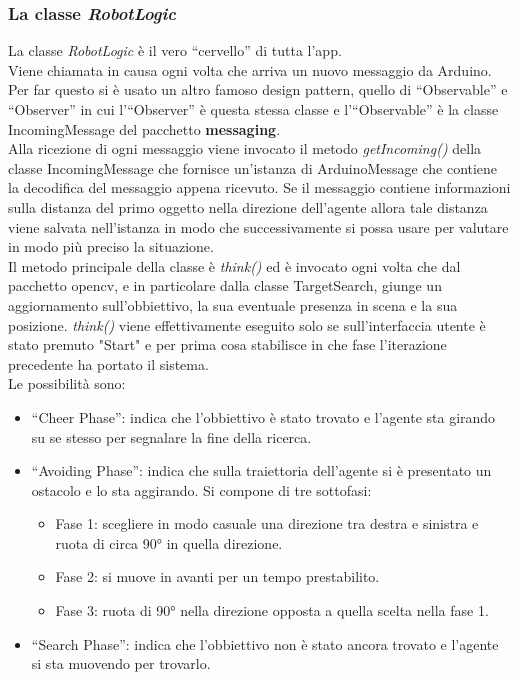 \subsubsection{La classe \emph{RobotLogic}}
La classe \emph{RobotLogic} è il vero ``cervello'' di tutta l'app.\\
Viene chiamata in causa ogni volta che arriva un nuovo messaggio da Arduino. 
Per far questo si è usato un altro famoso design pattern, quello di ``Observable'' 
e ``Observer'' in cui l'``Observer'' è questa stessa classe e l'``Observable''
è la classe IncomingMessage del pacchetto \textbf{messaging}.\\
Alla ricezione di ogni messaggio viene invocato il metodo \emph{getIncoming()} 
della classe IncomingMessage che fornisce un'istanza di ArduinoMessage che contiene 
la decodifica del messaggio appena ricevuto. Se il messaggio
contiene informazioni sulla distanza del primo oggetto nella direzione dell'agente
allora tale distanza viene salvata nell'istanza in modo che successivamente si
possa usare per valutare in modo più preciso la situazione.\\
Il metodo principale della classe è \emph{think()} ed è invocato ogni volta che
dal pacchetto opencv, e in particolare dalla classe TargetSearch, giunge un aggiornamento
sull'obbiettivo, la sua eventuale presenza in scena e la sua posizione. \emph{think()}
viene effettivamente eseguito solo se sull'interfaccia utente è stato premuto "Start"
e per prima cosa stabilisce in che fase l'iterazione precedente ha portato il sistema. \\
Le possibilità sono:
	\begin{itemize}
	\item ``Cheer Phase'': indica che l'obbiettivo è stato trovato e l'agente sta
	girando su se stesso per segnalare la fine della ricerca.
	\item ``Avoiding Phase'': indica che sulla traiettoria dell'agente si è presentato un ostacolo e lo sta aggirando. Si compone di tre sottofasi:
	\begin{itemize}
		\item Fase 1: scegliere in modo casuale una direzione tra destra e sinistra e ruota di circa 90° in quella direzione. 
		\item Fase 2: si muove in avanti per un tempo prestabilito.
		\item Fase 3: ruota di 90° nella direzione opposta a quella scelta nella fase 1.
	\end{itemize}
	\item ``Search Phase'': indica che l'obbiettivo non è stato ancora trovato e l'agente si sta muovendo per trovarlo.
	\end{itemize}
